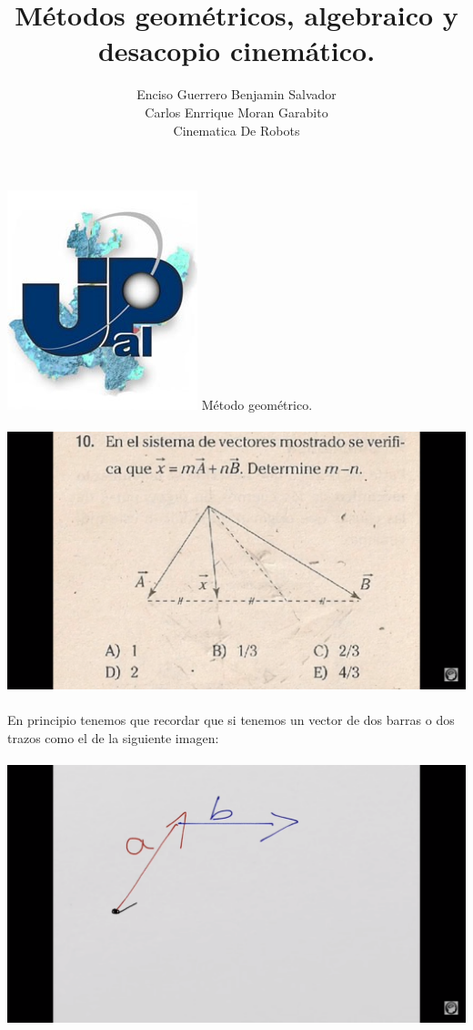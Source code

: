 \documentclass[12pt,a4paper]{article}
\author{Enciso Guerrero Benjamin Salvador\\
Carlos Enrrique Moran Garabito\\
Cinematica De Robots }
\title{Métodos geométricos, algebraico y desacopio cinemático.}
\begin{document}
\maketitle
\includegraphics[scale=1.8]{upzmgg.jpg} 
\newpage
Método geométrico.
\\\\
\includegraphics[scale=0.47]{imagen1.png} 
\\\\
En principio tenemos que recordar que si tenemos un vector de dos barras o dos trazos como el de la siguiente imagen:
\\\\
\includegraphics[scale=0.47]{imagen2.png} 
\end{document}
